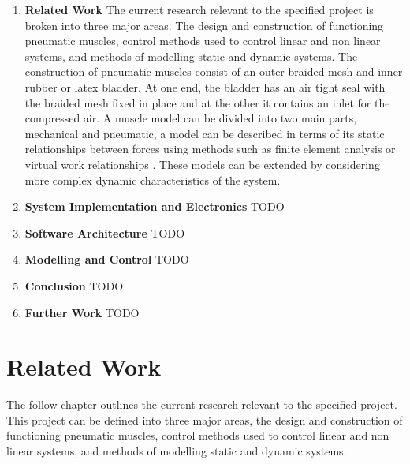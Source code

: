 \documentclass[11pt,a4paper]{article}
\begin{document}
\begin{enumerate}
\item \textbf{Related Work} The current research relevant to the specified project is broken into three major areas. The design and construction of functioning pneumatic muscles, control methods used to control linear and non linear systems, and methods of modelling static and dynamic systems. The construction of pneumatic muscles consist of an outer braided mesh and inner rubber or latex bladder. At one end, the bladder has an air tight seal with the braided mesh fixed in place and at the other it contains an inlet for the compressed air. A muscle model can be divided into two main parts, mechanical and pneumatic, a model can be described in terms of its static relationships between forces using methods such as finite element analysis or virtual work relationships . These models can be extended by considering more complex dynamic characteristics of the system.

\item \textbf{System Implementation and Electronics}
TODO
\newpage %
\item \textbf{Software Architecture}
TODO

\item \textbf{Modelling and Control}
TODO

\item \textbf{Conclusion} 
TODO
\newpage %

\item \textbf{Further Work}
TODO
\end{enumerate}

\newpage
\section{Related Work}
\label{sec:related_work}

The follow chapter outlines the current research relevant to the specified project. This project can be defined into three major areas, the design and construction of functioning pneumatic muscles, control methods used to control linear and non linear systems, and methods of modelling static and dynamic systems. 
\end{document}
